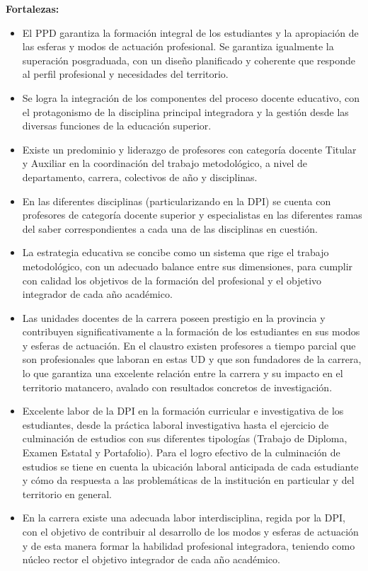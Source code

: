 \textbf{Fortalezas:}
\begin{itemize}
	\item El PPD garantiza la formación integral de los estudiantes y la apropiación de las esferas y modos de actuación profesional. Se garantiza igualmente la superación posgraduada, con un diseño planificado y coherente que responde al perfil profesional y necesidades del territorio.
	\item Se logra la integración de los componentes del proceso docente educativo, con el protagonismo de la disciplina principal integradora y la gestión desde las diversas funciones de la educación superior.
	\item Existe un predominio y liderazgo de profesores con categoría docente Titular y Auxiliar en la coordinación del trabajo metodológico, a nivel de departamento, carrera, colectivos de año y disciplinas.
	\item En las diferentes disciplinas (particularizando en la DPI) se cuenta con profesores de categoría docente superior y especialistas en las diferentes ramas del saber correspondientes a cada una de las disciplinas en cuestión.
	\item La estrategia educativa se concibe como un sistema que rige el trabajo metodológico, con un adecuado balance entre sus dimensiones, para cumplir con calidad los objetivos de la formación del profesional y el objetivo integrador de cada año académico.
	\item Las unidades docentes de la carrera poseen prestigio en la provincia y contribuyen significativamente a la formación de los estudiantes en sus modos y esferas de actuación. En el claustro existen profesores a tiempo parcial que son profesionales que laboran en estas UD y que son fundadores de la carrera, lo que garantiza una excelente relación entre la carrera y su impacto en el territorio matancero, avalado con resultados concretos de investigación. 
	\item Excelente labor de la DPI en la formación curricular e investigativa de los estudiantes, desde la práctica laboral investigativa hasta el ejercicio de culminación de estudios con sus diferentes tipologías (Trabajo de Diploma, Examen Estatal y Portafolio). Para el logro efectivo de la culminación de estudios se tiene en cuenta la ubicación laboral anticipada de cada estudiante y cómo da respuesta a las problemáticas de la institución en particular y del territorio en general.
	\item En la carrera existe una adecuada labor interdisciplina, regida por la DPI, con el objetivo de contribuir al desarrollo de los modos y esferas de actuación y de esta manera formar la habilidad profesional integradora, teniendo como núcleo rector el objetivo integrador de cada año académico.

\end{itemize}
